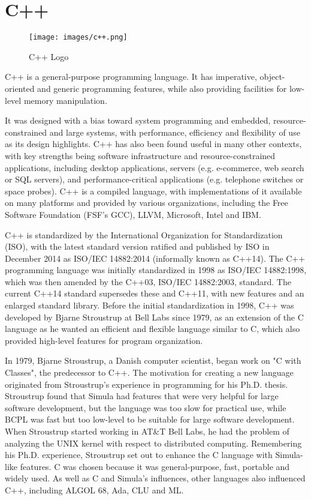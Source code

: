 \section{C++}

\begin{figure}[H]
	\centering \texttt{[image: images/c++.png]}
	\caption{C++ Logo}
\end{figure}

C++ is a general-purpose programming language. It has imperative, object-oriented and generic programming features, while also providing facilities for low-level memory manipulation.

It was designed with a bias toward system programming and embedded, resource-constrained and large systems, with performance, efficiency and flexibility of use as its design highlights. C++ has also been found useful in many other contexts, with key strengths being software infrastructure and resource-constrained applications, including desktop applications, servers (e.g. e-commerce, web search or SQL servers), and performance-critical applications (e.g. telephone switches or space probes). C++ is a compiled language, with implementations of it available on many platforms and provided by various organizations, including the Free Software Foundation (FSF's GCC), LLVM, Microsoft, Intel and IBM.

C++ is standardized by the International Organization for Standardization (ISO), with the latest standard version ratified and published by ISO in December 2014 as ISO/IEC 14882:2014 (informally known as C++14). The C++ programming language was initially standardized in 1998 as ISO/IEC 14882:1998, which was then amended by the C++03, ISO/IEC 14882:2003, standard. The current C++14 standard supersedes these and C++11, with new features and an enlarged standard library. Before the initial standardization in 1998, C++ was developed by Bjarne Stroustrup at Bell Labs since 1979, as an extension of the C language as he wanted an efficient and flexible language similar to C, which also provided high-level features for program organization.

In 1979, Bjarne Stroustrup, a Danish computer scientist, began work on "C with Classes", the predecessor to C++. The motivation for creating a new language originated from Stroustrup's experience in programming for his Ph.D. thesis. Stroustrup found that Simula had features that were very helpful for large software development, but the language was too slow for practical use, while BCPL was fast but too low-level to be suitable for large software development. When Stroustrup started working in AT\&T Bell Labs, he had the problem of analyzing the UNIX kernel with respect to distributed computing. Remembering his Ph.D. experience, Stroustrup set out to enhance the C language with Simula-like features. C was chosen because it was general-purpose, fast, portable and widely used. As well as C and Simula's influences, other languages also influenced C++, including ALGOL 68, Ada, CLU and ML.

